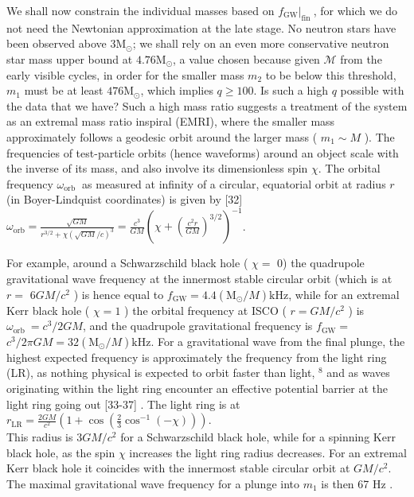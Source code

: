 \documentclass[10pt]{article}
\begin{document}
We shall now constrain the individual masses based on $\left.f_{\mathrm{GW}}\right|_{\text {fin }}$, for which we do not need the Newtonian approximation at the late stage. No neutron stars have been observed above $3 \mathrm{M}_{\odot}$; we shall rely on an even more conservative neutron star mass upper bound at $4.76 \mathrm{M}_{\odot}$, a value chosen because given $\mathscr{M}$ from the early visible cycles, in order for the smaller mass $m_{2}$ to be below this threshold, $m_{1}$ must be at least $476 \mathrm{M}_{\odot}$, which implies $q \geq 100$. Is such a high $q$ possible with the data that we have? Such a high mass ratio suggests a treatment of the system as an extremal mass ratio inspiral (EMRI), where the smaller mass approximately follows a geodesic orbit around the larger mass ( $m_{1} \sim M$ ). The frequencies of test-particle orbits (hence waveforms) around an object scale with the inverse of its mass, and also involve its dimensionless spin $\chi$. The orbital frequency $\omega_{\text {orb }}$ as measured at infinity of a circular, equatorial orbit at radius $r$ (in Boyer-Lindquist coordinates) is given by [32]\\
$\omega_{\mathrm{orb}}=\frac{\sqrt{G M}}{r^{3 / 2}+\chi(\sqrt{G M} / c)^{3}}=\frac{c^{3}}{G M}\left(\chi+\left(\frac{c^{2} r}{G M}\right)^{3 / 2}\right)^{-1}$.

For example, around a Schwarzschild black hole ( $\chi=$ 0) the quadrupole gravitational wave frequency at the innermost stable circular orbit (which is at $r=$ $6 G M / c^{2}$ ) is hence equal to $f_{\mathrm{GW}}=4.4\left(\mathrm{M}_{\odot} / M\right) \mathrm{kHz}$, while for an extremal Kerr black hole ( $\chi=1$ ) the orbital frequency at ISCO ( $r=G M / c^{2}$ ) is $\omega_{\text {orb }}=c^{3} / 2 G M$, and the quadrupole gravitational frequency is $f_{\mathrm{GW}}=$ $c^{3} / 2 \pi G M=32\left(\mathrm{M}_{\odot} / M\right) \mathrm{kHz}$. For a gravitational wave from the final plunge, the highest expected frequency is approximately the frequency from the light ring (LR), as nothing physical is expected to orbit faster than light, ${ }^{8}$ and as waves originating within the light ring encounter an effective potential barrier at the light ring going out [33-37] . The light ring is at\\
$r_{\mathrm{LR}}=\frac{2 G M}{c^{2}}\left(1+\cos \left(\frac{2}{3} \cos ^{-1}(-\chi)\right)\right)$.\\
This radius is $3 G M / c^{2}$ for a Schwarzschild black hole, while for a spinning Kerr black hole, as the spin $\chi$ increases the light ring radius decreases. For an extremal Kerr black hole it coincides with the innermost stable circular orbit at $G M / c^{2}$. The maximal gravitational wave frequency for a plunge into $m_{1}$ is then 67 Hz .
\end{document}
